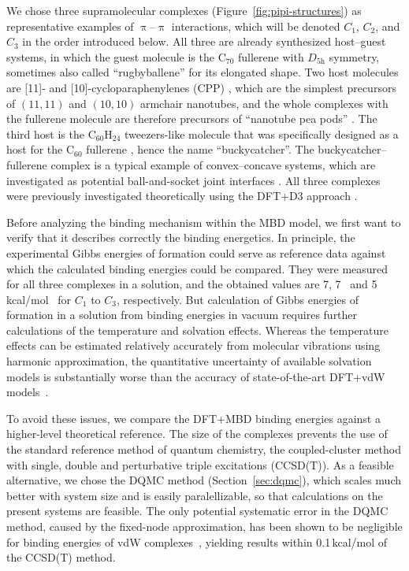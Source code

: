 We chose three supramolecular complexes (Figure~\ref{fig:pipi-structures}) as representative examples of $\uppi$--$\uppi$ interactions, which will be denoted $C_1$, $C_2$, and $C_3$ in the order introduced below.
All three are already synthesized host--guest systems, in which the guest molecule is the C$_{70}$ fullerene with $D_{5\mathrm h}$ symmetry, sometimes also called ``rugbyballene'' for its elongated shape.
Two host molecules are [11]- and [10]-cycloparaphenylenes (CPP) \citep{JastiJACS08}, which are the simplest precursors of $(11,11)$ and $(10,10)$ armchair nanotubes, and the whole complexes with the fullerene molecule are therefore precursors of ``nanotube pea pods'' \citep{OkadaPRL01,MonthiouxC02}.
The third host is the C$_{60}$H$_{24}$ tweezers-like molecule that was specifically designed as a host for the C$_{60}$ fullerene \citep{SygulaJACS07}, hence the name ``buckycatcher''.
The buckycatcher--fullerene complex is a typical example of convex--concave systems, which are investigated as potential ball-and-socket joint interfaces \citep{KawaseCR06,KawaseSCoFaCN12}.
All three complexes were previously investigated theoretically using the DFT+D3 approach \citep{GrimmeCEJ12,RisthausJCTC13,AntonyCC15}.

Before analyzing the binding mechanism within the MBD model, we first want to verify that it describes correctly the binding energetics.
In principle, the experimental Gibbs energies of formation could serve as reference data against which the calculated binding energies could be compared.
They were measured for all three complexes in a solution, and the obtained values are 7, 7~\cite{IwamotoCEJ13} and 5 kcal/mol~\cite{Muck-LichtenfeldPCCP10} for $C_1$ to $C_3$, respectively.
But calculation of Gibbs energies of formation in a solution from binding energies in vacuum requires further calculations of the temperature and solvation effects.
Whereas the temperature effects can be estimated relatively accurately from molecular vibrations using harmonic approximation, the quantitative uncertainty of available solvation models is substantially worse than the accuracy of state-of-the-art DFT+vdW models~\cite{YangNC13}.

To avoid these issues, we compare the DFT+MBD binding energies against a higher-level theoretical reference.
The size of the complexes prevents the use of the standard reference method of quantum chemistry, the coupled-cluster method with single, double and perturbative triple excitations (CCSD(T)).
As a feasible alternative, we chose the DQMC method (Section~\ref{sec:dqmc}), which scales much better with system size and is easily paralellizable, so that calculations on the present systems are feasible.
The only potential systematic error in the DQMC method, caused by the fixed-node approximation, has been shown to be negligible for binding energies of vdW complexes~\cite{DubeckyJCTC13}, yielding results within 0.1\,kcal/mol of the CCSD(T) method.

